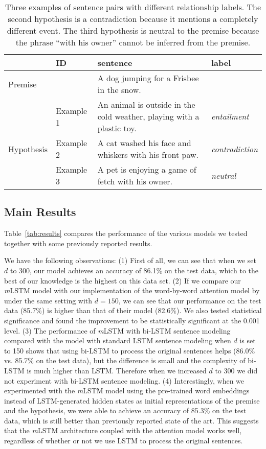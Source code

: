 \documentclass[11pt,letterpaper]{article}
\begin{document}
\begin{table*}[t]
	\centering
	\small
	\begin{tabular}{llll}
		\hline
		& \textbf{ID} & \textbf{sentence} & \textbf{label} \\
		\hline
		Premise & & A dog jumping for a Frisbee in the snow. & \\
		\hline
		& Example 1 & An animal is outside in the cold weather, playing with a plastic toy. & \emph{entailment} \\
		Hypothesis & Example 2 & A cat washed his face and whiskers with his front paw. & \emph{contradiction} \\
		& Example 3 & A pet is enjoying a game of fetch with his owner. & \emph{neutral}   \\
		\hline
	\end{tabular}
	\normalsize
	\caption{Three examples of sentence pairs with different relationship labels.
		The second hypothesis is a contradiction because it mentions a completely different event.
		The third hypothesis is neutral to the premise because the phrase ``with his owner'' cannot be inferred from the premise.}
	\label{tab:examples}
\end{table*}


\subsection{Main Results}

Table~\ref{tab:results} compares the performance of the various models we tested together with some previously reported results.


We have the following observations:
(1) First of all, we can see that when we set $d$ to 300, our model achieves an accuracy of 86.1\% on the test data, which to the best of our knowledge is the highest on this data set.
(2) If we compare our \emph{m}LSTM model with our implementation of the word-by-word attention model by  under the same setting with $d = 150$, we can see that our performance on the test data (85.7\%) is higher than that of their model (82.6\%).
We also tested statistical significance and found the improvement to be statistically significant at the 0.001 level.
(3) The performance of \emph{m}LSTM with bi-LSTM sentence modeling compared with the model with standard LSTM sentence modeling when $d$ is set to 150 shows that using bi-LSTM to process the original sentences helps (86.0\% vs. 85.7\% on the test data), but the difference is small and the complexity of bi-LSTM is much higher than LSTM.
Therefore when we increased $d$ to 300 we did not experiment with bi-LSTM sentence modeling.
(4) Interestingly, when we experimented with the \emph{m}LSTM model using the pre-trained word embeddings instead of LSTM-generated hidden states as initial representations of the premise and the hypothesis, we were able to achieve an accuracy of 85.3\% on the test data, which is still better than previously reported state of the art.
This suggests that the \emph{m}LSTM architecture coupled with the attention model works well, regardless of whether or not we use LSTM to process the original sentences.
\end{document}
